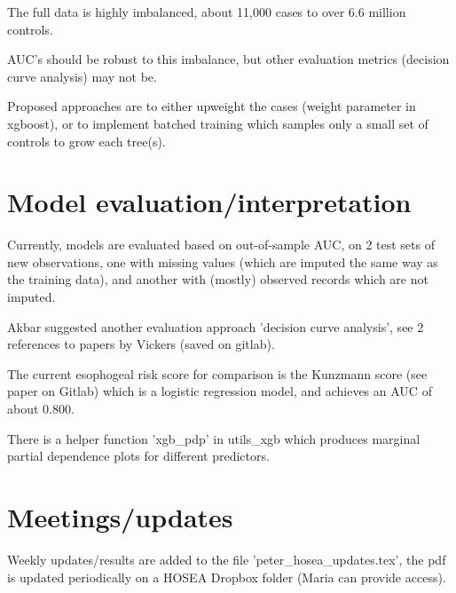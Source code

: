 \documentclass[12pt]{article}
\begin{document}
The full data is highly imbalanced, about 11,000 cases to over 6.6 million controls.

AUC's should be robust to this imbalance, but other evaluation metrics (decision curve analysis) may not be.

Proposed approaches are to either upweight the cases (weight parameter in xgboost), or to implement batched training which samples only a small set of controls to grow each tree(s).

\section*{Model evaluation/interpretation}

Currently, models are evaluated based on out-of-sample AUC, on 2 test sets of new observations, one with missing values (which are imputed the same way as the training data), and another with (mostly) observed records which are not imputed.

Akbar suggested another evaluation approach 'decision curve analysis', see 2 references to papers by Vickers (saved on gitlab).

The current esophogeal risk score for comparison is the Kunzmann score (see paper on Gitlab) which is a logistic regression model, and achieves an AUC of about 0.800.

There is a helper function 'xgb\_pdp' in utils\_xgb which produces marginal partial dependence plots for different predictors.

\section*{Meetings/updates}

Weekly updates/results are added to the file 'peter\_hosea\_updates.tex', the pdf is updated periodically on a HOSEA Dropbox folder (Maria can provide access).

%
\end{document}
